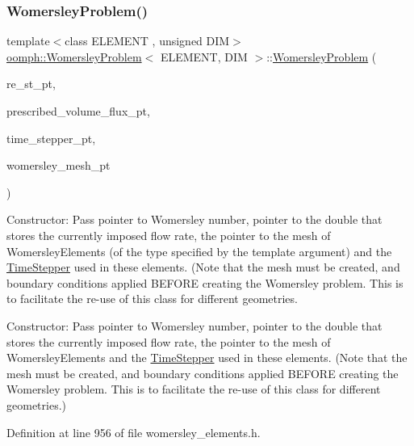 \subsubsection{\texorpdfstring{Womersley\+Problem()}{WomersleyProblem()}\hspace{0.1cm}{\footnotesize\ttfamily [1/2]}}
{\footnotesize\ttfamily template$<$class E\+L\+E\+M\+E\+NT , unsigned D\+IM$>$ \\
\hyperlink{classoomph_1_1WomersleyProblem}{oomph\+::\+Womersley\+Problem}$<$ E\+L\+E\+M\+E\+NT, D\+IM $>$\+::\hyperlink{classoomph_1_1WomersleyProblem}{Womersley\+Problem} (\begin{DoxyParamCaption}\item[{double $\ast$}]{re\+\_\+st\+\_\+pt,  }\item[{double $\ast$}]{prescribed\+\_\+volume\+\_\+flux\+\_\+pt,  }\item[{\hyperlink{classoomph_1_1TimeStepper}{Time\+Stepper} $\ast$}]{time\+\_\+stepper\+\_\+pt,  }\item[{\hyperlink{classoomph_1_1Mesh}{Mesh} $\ast$}]{womersley\+\_\+mesh\+\_\+pt }\end{DoxyParamCaption})}



Constructor\+: Pass pointer to Womersley number, pointer to the double that stores the currently imposed flow rate, the pointer to the mesh of Womersley\+Elements (of the type specified by the template argument) and the \hyperlink{classoomph_1_1TimeStepper}{Time\+Stepper} used in these elements. (Note that the mesh must be created, and boundary conditions applied B\+E\+F\+O\+RE creating the Womersley problem. This is to facilitate the re-\/use of this class for different geometries. 

Constructor\+: Pass pointer to Womersley number, pointer to the double that stores the currently imposed flow rate, the pointer to the mesh of Womersley\+Elements and the \hyperlink{classoomph_1_1TimeStepper}{Time\+Stepper} used in these elements. (Note that the mesh must be created, and boundary conditions applied B\+E\+F\+O\+RE creating the Womersley problem. This is to facilitate the re-\/use of this class for different geometries.) 

Definition at line 956 of file womersley\+\_\+elements.\+h.

\mbox{\label{classoomph_1_1WomersleyProblem_adc4074cd09df4505feb27e22abb6922a}} 
